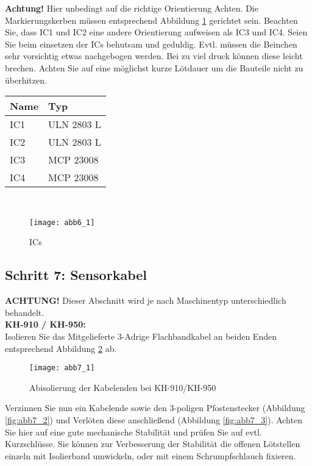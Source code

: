 \documentclass[fleqn,10pt]{SelfArx} %
\begin{document}
\textbf{Achtung!} Hier unbedingt auf die richtige Orientierung Achten. Die Markierungskerben müssen entsprechend Abbildung \ref{fig:abb6_1} gerichtet sein. Beachten Sie, dass IC1 und IC2 eine andere Orientierung aufweisen als IC3 und IC4. Seien Sie beim einsetzen der ICs behutsam und geduldig. Evtl. müssen die Beinchen sehr vorsichtig etwas nachgebogen werden. Bei zu viel druck können diese leicht brechen. Achten Sie auf eine möglichst kurze Lötdauer um die Bauteile nicht zu überhitzen.\\
\begin{tabular}{ll}
\hline
\textbf{Name} & \textbf{Typ} \\ \hline
IC1           & ULN 2803 L   \\ \hline
IC2           & ULN 2803 L   \\ \hline
IC3           & MCP 23008    \\ \hline
IC4           & MCP 23008    \\ \hline
\end{tabular}\\

\begin{figure}[tbhp]\centering
\texttt{[image: abb6\_1]}
\caption{ICs}
\label{fig:abb6_1}
\end{figure}

\FloatBarrier

 \subsection*{Schritt 7: Sensorkabel}

\textbf{ACHTUNG!} Dieser Abschnitt wird je nach Maschinentyp unterschiedlich behandelt.\\

\textbf{KH-910 / KH-950:} \\

Isolieren Sie das Mitgelieferte 3-Adrige Flachbandkabel an beiden Enden entsprechend Abbildung \ref{fig:abb7_1} ab.

\begin{figure}[tbhp]\centering
\texttt{[image: abb7\_1]}
\caption{Abisolierung der Kabelenden bei KH-910/KH-950}
\label{fig:abb7_1}
\end{figure}

Verzinnen Sie nun ein Kabelende sowie den 3-poligen Pfostenstecker (Abbildung \ref{fig:abb7_2}) und Verlöten diese anschließend (Abbildung \ref{fig:abb7_3}). Achten Sie hier auf eine gute mechanische Stabilität und prüfen Sie auf evtl. Kurzschlüsse. Sie können zur Verbesserung der Stabilität die offenen Lötstellen einzeln mit Isolierband umwickeln, oder mit einem Schrumpfschlauch fixieren.
\end{document}
